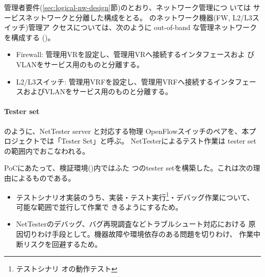 管理者要件(\ref{sec:logical-nw-design}節)のとおり、ネットワーク管理につ
いては \yo サービスネットワークと分離した構成をとる。
のネットワーク機器(FW, L2/L3スイッチ)管理ア
クセスについては、次のように out-of-band な管理ネットワークを構成する
()。
\begin{itemize}
 \item Firewall: 管理用VRを設定し、管理用VRへ接続するインタフェースおよ
       びVLANをサービス用のものと分離する。
 \item L2/L3スイッチ: 管理用VRFを設定し、管理用VRFへ接続するインタフェー
       スおよびVLANをサービス用のものと分離する。
\end{itemize}

    \paragraph{Tester set}
のように、NetTester server と対応する物理
OpenFlowスイッチのペアを、本プロジェクトでは「Tester Set」と呼ぶ。
NetTesterによるテスト作業は tester set の範囲内でおこなわれる。

PoCにあたって、検証環境()内ではふた
つのtester setを構築した。これは次の理由によるものである。
\begin{itemize}
 \item テストシナリオ実装のうち、実装・テスト実行\footnote{テストシナリ
       オの動作テスト}・デバッグ作業について、可能な範囲で並行して作業で
       きるようにするため。
 \item NetTesterのデバッグ、バグ再現調査などトラブルシュート対応における
       原因切りわけ手段として。機器故障や環境依存のある問題を切りわけ、
       作業中断リスクを回避するため。
\end{itemize}

